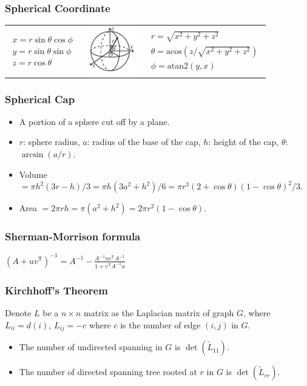\vspace{-0.5em}
\subsubsection{Spherical Coordinate}
\begin{tabular}{b{2.5cm}m{2cm}b{2.5cm}}
  {$\begin{aligned}
      x = r\sin\theta\cos\phi \\
      y = r\sin\theta\sin\phi \\
      z = r\cos\theta
  \end{aligned}$}
    &
    \hbox{
      \includegraphics[width=20mm]{../codes/Misc/sphericalCoordinates.pdf}
    }
    &
    {$\begin{aligned}
        r = \sqrt{x^2+y^2+z^2} \\
        \theta = \textrm{acos}(z/\sqrt{x^2+y^2+z^2}) \\
        \phi = \textrm{atan2}(y,x)
    \end{aligned}$}
\end{tabular}

\subsubsection{Spherical Cap}
\begin{itemize}
  \item A portion of a sphere cut off by a plane.
  \item $r$: sphere radius, $a$: radius of the base of the cap, $h$: height of the cap, $\theta$: $\arcsin(a/r)$.
  \item Volume $=\pi h^2(3r-h)/3=\pi h(3a^2+h^2)/6=\pi r^3(2+\cos\theta)(1-\cos\theta)^2/3$.
  \item Area $=2\pi rh=\pi(a^2+h^2)=2\pi r^2(1-\cos\theta)$.
\end{itemize}


\subsubsection{Sherman-Morrison formula}
$\left(A + uv^\textsf{T}\right)^{-1} = A^{-1} - \frac{A^{-1}uv^\textsf{T}A^{-1}}{1 + v^\textsf{T}A^{-1}u}$

\subsubsection{Kirchhoff's Theorem}
Denote $L$ be a $n \times n$ matrix as the Laplacian matrix of graph $G$, where $L_{ii} = d(i)$, $L_{ij} = -c$ where $c$ is the number of edge $(i, j)$ in $G$.
\begin{itemize}
    \item The number of undirected spanning in $G$ is $\det(\tilde{L}_{11})$.
    \item The number of directed spanning tree rooted at $r$ in $G$ is $\det(\tilde{L}_{rr})$.
\end{itemize}

